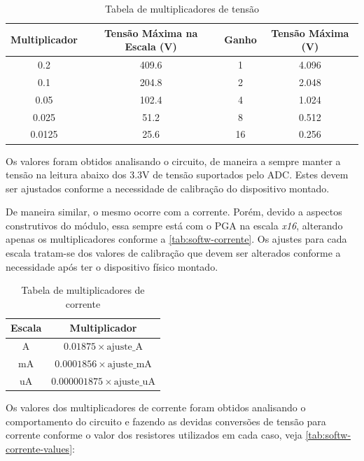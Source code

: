 \begin{table}[h!]
    \centering
    \caption{Tabela de multiplicadores de tensão}
    \begin{tabular}{|c|c|c|c|}
        \hline
        \textbf{Multiplicador} & \textbf{Tensão Máxima na Escala (V)} & \textbf{Ganho} & \textbf{Tensão Máxima (V)} \\
        \hline
        0.2 & 409.6 & 1 & 4.096 \\
        0.1 & 204.8 & 2 & 2.048 \\
        0.05 & 102.4 & 4 & 1.024 \\
        0.025 & 51.2 & 8 & 0.512 \\
        0.0125 & 25.6 & 16 & 0.256 \\
        \hline
    \end{tabular}
    \label{tab:softw-tensao}
    \fonte{}
\end{table}

Os valores foram obtidos analisando o circuito, de maneira a sempre manter a tensão na leitura abaixo dos 3.3V de tensão suportados pelo \gls{ADC}. Estes devem ser ajustados conforme a necessidade de calibração do dispositivo montado.

De maneira similar, o mesmo ocorre com a corrente. Porém, devido a aspectos construtivos do módulo, essa sempre está com o \gls{PGA} na escala \textit{x16}, alterando apenas os multiplicadores conforme a \autoref{tab:softw-corrente}.
Os ajustes para cada escala tratam-se dos valores de calibração que devem ser alterados conforme a necessidade após ter o dispositivo físico montado.

\begin{table}[h!]
    \centering
    \caption{Tabela de multiplicadores de corrente}
    \begin{tabular}{|c|c|}
        \hline
        \textbf{Escala} & \textbf{Multiplicador} \\
        \hline
        A & $0.01875 \times \text{ajuste\_A}$ \\
        mA & $0.0001856 \times \text{ajuste\_mA}$ \\
        uA & $0.000001875 \times \text{ajuste\_uA}$ \\
        \hline
    \end{tabular}
    \label{tab:softw-corrente}
    \fonte{}
\end{table}

Os valores dos multiplicadores de corrente foram obtidos analisando o comportamento do circuito e fazendo as devidas conversões de tensão para corrente conforme o valor dos resistores utilizados em cada caso, veja \autoref{tab:softw-corrente-values}:

